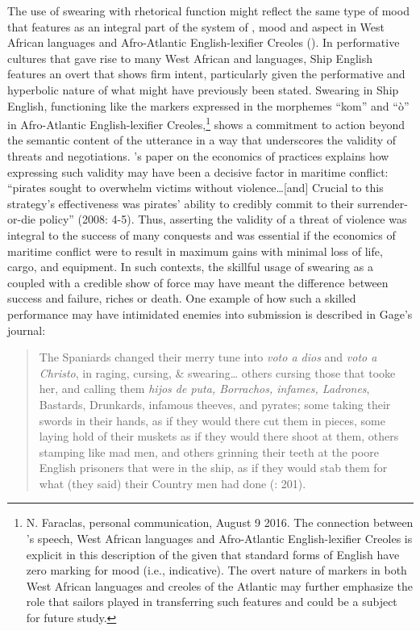 The use of swearing with rhetorical function might reflect the same type of  mood that features as an integral part of the system of , mood and aspect in West African languages and Afro-Atlantic English-lexifier Creoles (\citealt{FaraclasEtAl2016}). In performative cultures that gave rise to many West African and  languages, Ship English features an overt  that shows firm intent, particularly given the performative and hyperbolic nature of what might have previously been stated. Swearing in Ship English, functioning like the  markers expressed in the morphemes “kom” and “ò” in Afro-Atlantic English-lexifier Creoles,\footnote{N. Faraclas, 
  personal communication, August 9 2016. The connection between ’s speech, West African languages and Afro-Atlantic English-lexifier Creoles is explicit in this description of the  given that standard forms of English have zero marking for  mood (i.e., indicative). The overt nature of  markers in both West African languages and creoles of the Atlantic may further emphasize the role that sailors played in transferring such features and could be a subject for future study.} 
shows a commitment to action beyond the semantic content of the utterance in a way that underscores the validity of threats and negotiations. \citet{Leeson2008}’s paper on the economics of  practices explains how expressing such validity may have been a decisive factor in maritime conflict: “pirates sought to overwhelm victims without violence…[and] Crucial to this strategy’s effectiveness was pirates’ ability to credibly commit to their surrender-or-die policy” (2008: 4-5). Thus, asserting the validity of a threat of violence was integral to the success of many  conquests and was essential if the economics of maritime conflict were to result in maximum gains with minimal loss of life, cargo, and equipment. In such contexts, the skillful usage of swearing as a  coupled with a credible show of force may have meant the difference between success and failure, riches or death. One example of how such a skilled performance may have intimidated enemies into submission is described in Gage’s journal:

\begin{quotation}
The Spaniards changed their merry tune into \textit{voto a dios} and \textit{voto a Christo}, in raging, cursing, \& swearing… others cursing those that tooke her, and calling them \textit{hijos de puta, Borrachos, infames, Ladrones}, Bastards, Drunkards, infamous theeves, and pyrates; some taking their swords in their hands, as if they would there cut them in pieces, some laying hold of their muskets as if they would there shoot at them, others stamping like mad men, and others grinning their teeth at the poore English prisoners that were in the ship, as if they would stab them for what (they said) their Country men had done (\citealt{Gage1648}: 201).
\end{quotation}

